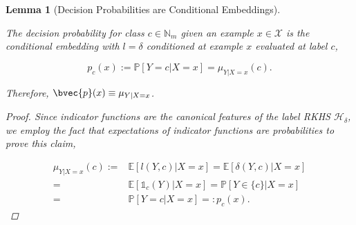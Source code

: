 \documentclass{article}
\newtheorem{lemma}[theorem]{Lemma}
\numberwithin{equation}{section}
\numberwithin{table}{section}
\numberwithin{algorithm}{section}
\begin{document}
	\begin{lemma}[Decision Probabilities are Conditional Embeddings]
	\label{thm:probability_is_embedding}
	
		The decision probability for class $c \in \mathbb{N}_{m}$ given an example $x \in \mathcal{X}$ is the conditional embedding with $l = \delta$ conditioned at example $x$ evaluated at label $c$,
		
		\begin{equation}
			p_{c}(x) := \mathbb{P}[Y = c | X = x] = \mu_{Y | X = x}(c).
		\end{equation}
		
		Therefore, $\bvec{p}(x) \equiv \mu_{Y | X = x}$.
		
		\begin{proof} 
		
			Since indicator functions are the canonical features of the label RKHS $\mathcal{H}_{\delta}$, we employ the fact that expectations of indicator functions are probabilities to prove this claim,
			
			\begin{equation}
				\begin{aligned}
					\mu_{Y | X = x}(c) :=& \mathbb{E}[l(Y, c) | X = x ]= \mathbb{E}[\delta(Y, c) | X = x] \\
					=& \mathbb{E}[\mathbb{1}_{c}(Y) | X = x] = \mathbb{P}[Y \in \{c\} | X = x] \\
					=& \mathbb{P}[Y = c | X = x] =: p_{c}(x).
				\end{aligned}
			\end{equation}
			
		\end{proof}

	\end{lemma}
	
\end{document}
